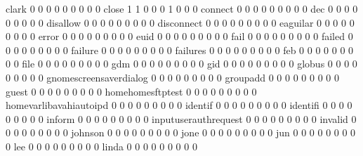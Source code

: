\documentclass[compress,8pt]{beamer}
\begin{document}
\begin{frame}
\begin{Schunk}
  clark                                      0   0   0   0   0   0   0   0   0
  close                                      1   1   0   0   0   1   0   0   0
  connect                                    0   0   0   0   0   0   0   0   0
  dec                                        0   0   0   0   0   0   0   0   0
  disallow                                   0   0   0   0   0   0   0   0   0
  disconnect                                 0   0   0   0   0   0   0   0   0
  eaguilar                                   0   0   0   0   0   0   0   0   0
  error                                      0   0   0   0   0   0   0   0   0
  euid                                       0   0   0   0   0   0   0   0   0
  fail                                       0   0   0   0   0   0   0   0   0
  failed                                     0   0   0   0   0   0   0   0   0
  failure                                    0   0   0   0   0   0   0   0   0
  failures                                   0   0   0   0   0   0   0   0   0
  feb                                        0   0   0   0   0   0   0   0   0
  file                                       0   0   0   0   0   0   0   0   0
  gdm                                        0   0   0   0   0   0   0   0   0
  gid                                        0   0   0   0   0   0   0   0   0
  globus                                     0   0   0   0   0   0   0   0   0
  gnomescreensaverdialog                     0   0   0   0   0   0   0   0   0
  groupadd                                   0   0   0   0   0   0   0   0   0
  guest                                      0   0   0   0   0   0   0   0   0
  homehomesftptest                           0   0   0   0   0   0   0   0   0
  homevarlibavahiautoipd                     0   0   0   0   0   0   0   0   0
  identif                                    0   0   0   0   0   0   0   0   0
  identifi                                   0   0   0   0   0   0   0   0   0
  inform                                     0   0   0   0   0   0   0   0   0
  inputuserauthrequest                       0   0   0   0   0   0   0   0   0
  invalid                                    0   0   0   0   0   0   0   0   0
  johnson                                    0   0   0   0   0   0   0   0   0
  jone                                       0   0   0   0   0   0   0   0   0
  jun                                        0   0   0   0   0   0   0   0   0
  lee                                        0   0   0   0   0   0   0   0   0
  linda                                      0   0   0   0   0   0   0   0   0

\end{Schunk}
\end{frame}
\end{document}
